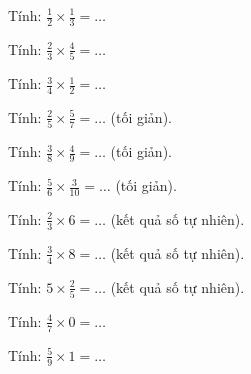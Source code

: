 \begin{ex}
Tính: $\frac{1}{2} \times \frac{1}{3} = \dots$
\end{ex}

\begin{ex}
Tính: $\frac{2}{3} \times \frac{4}{5} = \dots$
\end{ex}

\begin{ex}
Tính: $\frac{3}{4} \times \frac{1}{2} = \dots$
\end{ex}

\begin{ex}
Tính: $\frac{2}{5} \times \frac{5}{7} = \dots$ (tối giản).
\end{ex}

\begin{ex}
Tính: $\frac{3}{8} \times \frac{4}{9} = \dots$ (tối giản).
\end{ex}

\begin{ex}
Tính: $\frac{5}{6} \times \frac{3}{10} = \dots$ (tối giản).
\end{ex}

\begin{ex}
Tính: $\frac{2}{3} \times 6 = \dots$ (kết quả số tự nhiên).
\end{ex}

\begin{ex}
Tính: $\frac{3}{4} \times 8 = \dots$ (kết quả số tự nhiên).
\end{ex}

\begin{ex}
Tính: $5 \times \frac{2}{5} = \dots$ (kết quả số tự nhiên).
\end{ex}

\begin{ex}
Tính: $\frac{4}{7} \times 0 = \dots$
\end{ex}

\begin{ex}
Tính: $\frac{5}{9} \times 1 = \dots$
\end{ex}

